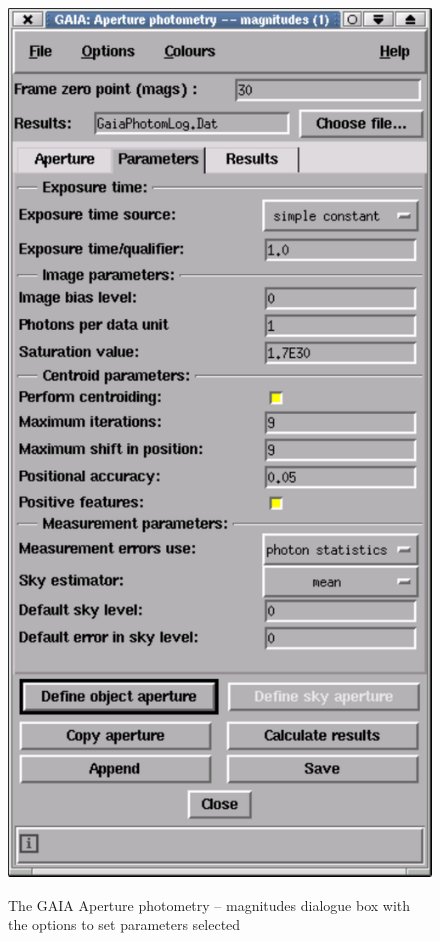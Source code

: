 \documentclass[twoside,11pt,nolof]{starlink}
\begin{document}
\begin{enumerate}
\begin{figure}[htbp]
     \includegraphics[totalheight=5.5in]{sc6_gaia4}
     \begin{quote}
     \caption[Setting parameters in the \textsf{Aperture photometry --
      magnitudes} dialogue box]
      {The GAIA \textsf{Aperture photometry -- magnitudes} dialogue box with
      the options to set parameters selected
     \label{g5} }
     \end{quote}
  \end{figure}


\end{enumerate}
\end{document}
